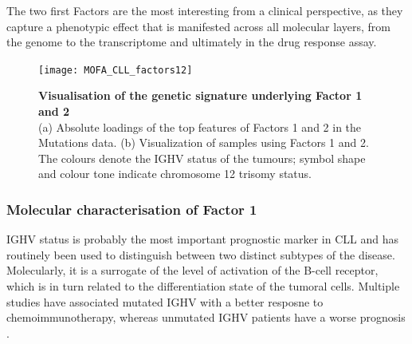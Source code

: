 The two first Factors are the most interesting from a clinical perspective, as they capture a phenotypic effect that is manifested across all molecular layers, from the genome to the transcriptome and ultimately in the drug response assay.


\begin{figure}[H]
	\centering 	
	\texttt{[image: MOFA\_CLL\_factors12]}
	\caption{\textbf{Visualisation of the genetic signature underlying Factor 1 and 2}\\
	(a) Absolute loadings of the top features of Factors 1 and 2 in the Mutations data.
	(b) Visualization of samples using Factors 1 and 2. The colours denote the IGHV status of the tumours; symbol shape and colour tone indicate chromosome 12 trisomy status.
	}
	\label{fig:MOFA_CLL_factors12}
\end{figure}

\subsubsection{Molecular characterisation of Factor 1}

IGHV status is probably the most important prognostic marker in CLL and has routinely been used to distinguish between two distinct subtypes of the disease. Molecularly, it is a surrogate of the level of activation of the B-cell receptor, which is in turn related to the differentiation state of the tumoral cells. Multiple studies have associated mutated IGHV with a better resposne to chemoimmunotherapy, whereas unmutated IGHV patients have a worse prognosis \cite{Fabbri2016,Bulian2017,Crombie2017,Damle1999}.

